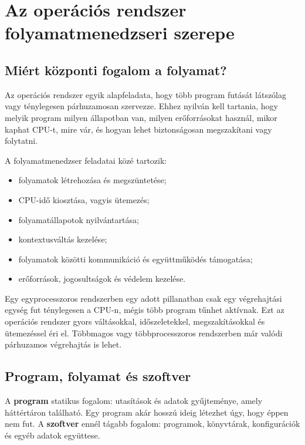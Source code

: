 \begin{center}

\end{center}

\section{Az operációs rendszer folyamatmenedzseri szerepe}

\subsection{Miért központi fogalom a folyamat?}

Az operációs rendszer egyik alapfeladata, hogy több program futását látszólag vagy ténylegesen párhuzamosan szervezze. Ehhez nyilván kell tartania, hogy melyik program milyen állapotban van, milyen erőforrásokat használ, mikor kaphat CPU-t, mire vár, és hogyan lehet biztonságosan megszakítani vagy folytatni.

A folyamatmenedzser feladatai közé tartozik:

\begin{itemize}
  \item folyamatok létrehozása és megszüntetése;
  \item CPU-idő kiosztása, vagyis ütemezés;
  \item folyamatállapotok nyilvántartása;
  \item kontextusváltás kezelése;
  \item folyamatok közötti kommunikáció és együttműködés támogatása;
  \item erőforrások, jogosultságok és védelem kezelése.
\end{itemize}

Egy egyprocesszoros rendszerben egy adott pillanatban csak egy végrehajtási egység fut ténylegesen a CPU-n, mégis több program tűnhet aktívnak. Ezt az operációs rendszer gyors váltásokkal, időszeletekkel, megszakításokkal és ütemezéssel éri el. Többmagos vagy többprocesszoros rendszerben már valódi párhuzamos végrehajtás is lehet.

\subsection{Program, folyamat és szoftver}

A \textbf{program} statikus fogalom: utasítások és adatok gyűjteménye, amely háttértáron található. Egy program akár hosszú ideig létezhet úgy, hogy éppen nem fut. A \textbf{szoftver} ennél tágabb fogalom: programok, könyvtárak, konfigurációk és egyéb adatok együttese.

